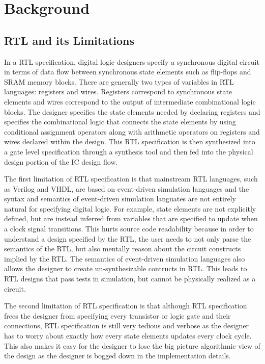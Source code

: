 \section{Background}
\subsection{RTL and its Limitations}
\label{section:RTLCons}
In a RTL specification, digital logic designers specify a synchronous digital circuit in terms of data flow between synchronous state elements such as flip-flops and SRAM memory blocks. There are generally two types of variables in RTL languages: registers and wires. Registers correspond to synchronous state elements and wires correspond to the output of intermediate combinational logic blocks. The designer specifies the state elements needed by declaring registers and specifies the combinational logic that connects the state elements by using conditional assignment operators along with arithmetic operators on registers and wires declared within the design. This RTL specification is then synthesized into a gate level specification through a synthesis tool and then fed into the physical design portion of the IC design flow. 

The first limitation of RTL specification is that mainstream RTL languages, such as Verilog and VHDL, are based on event-driven simulation languages and the syntax and semantics of event-driven simulation languates are not entirely natural for specifying digital logic. For example, state elements are not explicitly defined, but are instead inferred from variables that are specified to update when a clock signal transitions. This hurts source code readability because in order to understand a design specified by the RTL, the user needs to not only parse the semantics of the RTL, but also mentally reason about the circuit constructs implied by the RTL. The semantics of event-driven simulation languages also allows the designer to create un-synthesizable contructs in RTL. This leads to RTL designs that pass tests in simulation, but cannot be physically realized as a circuit.

The second limitation of RTL specification is that although RTL specification frees the designer from specifying every transistor or logic gate and their connections, RTL specification is still very tedious and verbose as the designer has to worry about exactly how every state elements updates every clock cycle. This also makes it easy for the designer to lose the big picture algorithmic view of the design as the designer is bogged down in the implementation details. 

